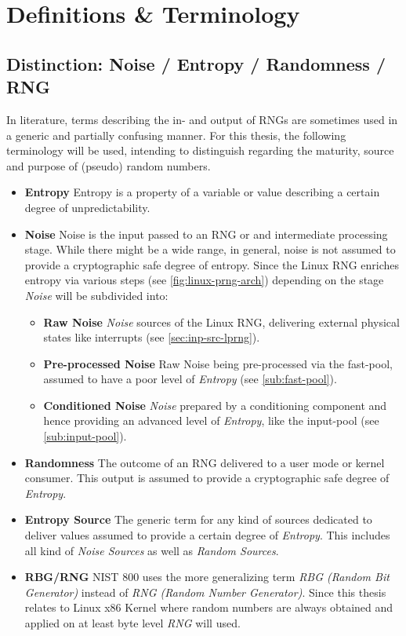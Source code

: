 \section{Definitions \& Terminology}

\subsection{Distinction: Noise / Entropy / Randomness / RNG}
In literature, terms describing the in- and output of RNGs are sometimes used in a generic and partially confusing manner. For this thesis, the following terminology will be used, intending to distinguish regarding the maturity, source and purpose of (pseudo) random numbers.

\begin{itemize}
	\item \textbf{Entropy} Entropy is a property of a variable or value describing a certain degree of unpredictability. 
	\item \textbf{Noise} Noise is the input passed to an RNG or and intermediate processing stage.
	While there might be a wide range, in general, noise is not assumed to provide a cryptographic safe degree of entropy. Since the Linux RNG enriches entropy via various steps (see \ref{fig:linux-prng-arch}) depending on the stage \textit{Noise} will be subdivided into:
	\begin{itemize}
		\item \textbf{Raw Noise} \textit{Noise} sources of the Linux RNG, delivering external physical states like interrupts (see \ref{sec:inp-src-lprng}).
		\item \textbf{Pre-processed Noise} Raw Noise being pre-processed via the fast-pool, assumed to have a poor level of \textit{Entropy} (see \ref{sub:fast-pool}).
		\item \textbf{Conditioned Noise} \textit{Noise} prepared by a conditioning component and hence providing an advanced level of \textit{Entropy}, like the input-pool (see \ref{sub:input-pool}).	
	\end{itemize}
	\item \textbf{Randomness} The outcome of an RNG delivered to a user mode or kernel consumer. This output is assumed to provide a cryptographic safe degree of \textit{Entropy}.
	\item \textbf{Entropy Source} The generic term for any kind of sources dedicated to deliver values assumed to provide a certain degree of \textit{Entropy}. This includes all kind of \textit{Noise Sources} as well as \textit{Random Sources}.	
	\item \textbf{RBG/RNG} NIST 800 uses the more generalizing term \textit{RBG (Random Bit Generator)} instead of \textit{RNG (Random Number Generator)}. Since this thesis relates to Linux x86 Kernel where random numbers are always obtained and applied on at least byte level \textit{RNG} will used.
\end{itemize}

